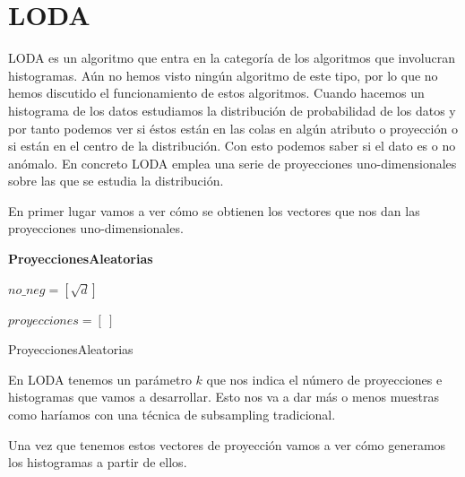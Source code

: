 \section{LODA}

LODA es un algoritmo que entra en la categoría de los algoritmos que involucran histogramas. Aún no hemos visto ningún algoritmo de este tipo, por lo que no hemos discutido el funcionamiento de estos algoritmos. Cuando hacemos un histograma de los datos estudiamos la distribución de probabilidad de los datos y por tanto podemos ver si éstos están en las colas en algún atributo o proyección o si están en el centro de la distribución. Con esto podemos saber si el dato es o no anómalo. En concreto LODA emplea una serie de proyecciones uno-dimensionales sobre las que se estudia la distribución. 

En primer lugar vamos a ver cómo se obtienen los vectores que nos dan las proyecciones uno-dimensionales.

\begin{algorithm}[H]{\textbf{ProyeccionesAleatorias}}
	
	
	$no\_neg = [\sqrt{d}]$
	
	$proyecciones = [ \ ]$
	
	
	
	\caption{ProyeccionesAleatorias}
	\label{proyecciones_aleatorias}
\end{algorithm}

En LODA tenemos un parámetro $k$ que nos indica el número de proyecciones e histogramas que vamos a desarrollar. Esto nos va a dar más o menos muestras como haríamos con una técnica de subsampling tradicional. 

Una vez que tenemos estos vectores de proyección vamos a ver cómo generamos los histogramas a partir de ellos.

